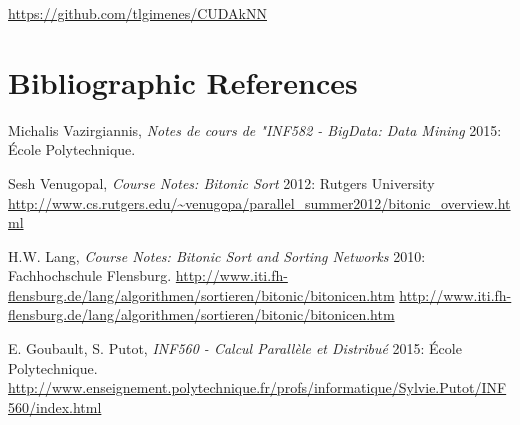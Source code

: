 \documentclass[12pt,oneside]{article}
\begin{document}
\url{https://github.com/tlgimenes/CUDAkNN}


\section{Bibliographic References}

  \begin{thebibliography}{1}

   Michalis Vazirgiannis, {\em Notes de cours de "INF582 - BigData: Data Mining} 2015:
  École Polytechnique.
  
   Sesh Venugopal, {\em Course Notes: Bitonic Sort} 2012: Rutgers University
	\url{http://www.cs.rutgers.edu/~venugopa/parallel_summer2012/bitonic_overview.html}
  
   H.W. Lang, {\em Course Notes: Bitonic Sort and Sorting Networks} 2010: Fachhochschule Flensburg.
  \url{http://www.iti.fh-flensburg.de/lang/algorithmen/sortieren/bitonic/bitonicen.htm}
  \url{http://www.iti.fh-flensburg.de/lang/algorithmen/sortieren/bitonic/bitonicen.htm}
  
   E. Goubault, S. Putot, {\em INF560 - Calcul Parallèle et Distribué} 2015: École Polytechnique.
  \url{http://www.enseignement.polytechnique.fr/profs/informatique/Sylvie.Putot/INF560/index.html}
  


  \end{thebibliography}
\end{document}
